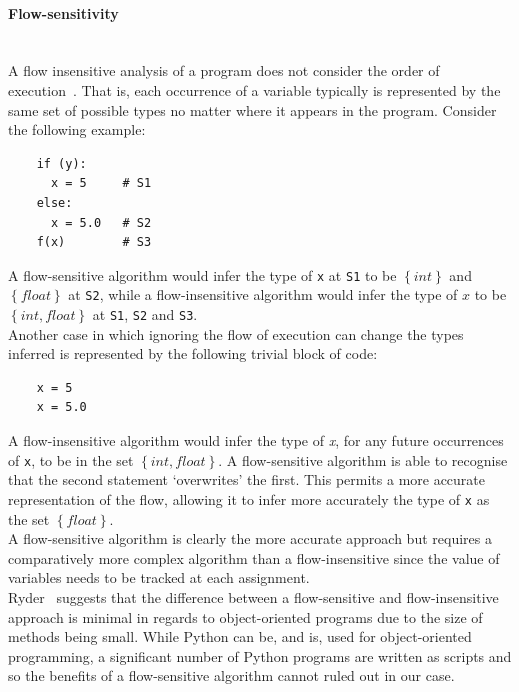 \documentclass[12pt, titlepage]{article}
\begin{document}
\paragraph*{Flow-sensitivity}\mbox{} \\
A flow insensitive analysis of a program does not consider the order of execution~\cite{nielson99}. That is, each occurrence of a variable typically is represented by the same set of possible types no matter where it appears in the program. Consider the following example:
\begin{lstlisting}
    if (y):	
      x = 5     # S1
    else:
      x = 5.0   # S2
    f(x)        # S3
\end{lstlisting}
A flow-sensitive algorithm would infer the type of \texttt{x} at \texttt{S1} to be $\left\{ {int}\right\}$ and $\left\{ {float}\right\}$ at \texttt{S2}, while a flow-insensitive algorithm would infer the type of $x$ to be $\left\{ {int, float}\right\}$ at \texttt{S1}, \texttt{S2} and \texttt{S3}. \\
\indent Another case in which ignoring the flow of execution can change the types inferred is represented by the following trivial block of code:
\begin{lstlisting}
    x = 5
    x = 5.0
\end{lstlisting}
A flow-insensitive algorithm would infer the type of \textit{x}, for any future occurrences of \texttt{x}, to be in the set $\left\{ {int, float}\right\}$. A flow-sensitive algorithm is able to recognise that the second statement `overwrites' the first. This permits a more accurate representation of the flow, allowing it to infer more accurately the type of \texttt{x} as the set $\left\{ {float}\right\}$. \\
\indent A flow-sensitive algorithm is clearly the more accurate approach but requires a comparatively more complex algorithm than a flow-insensitive since the value of variables needs to be tracked at each assignment. \\
\indent Ryder~\cite{ryder03} suggests that the difference between a flow-sensitive and flow-insensitive approach is minimal in regards to object-oriented programs due to the size of methods being small. While Python can be, and is, used for object-oriented programming, a significant number of Python programs are written as scripts and so the benefits of a flow-sensitive algorithm cannot ruled out in our case.
\end{document}
